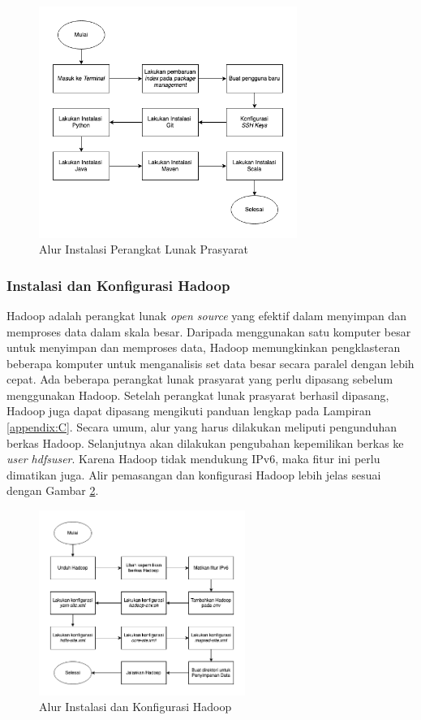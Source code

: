 \begin{figure}[h!]
    \centering
    \includegraphics[width=0.75\textwidth]{figures/ch03/prasayarat-flow.png}
    \caption{Alur Instalasi Perangkat Lunak Prasyarat}
    \label{fig:prasyarat-flow}
\end{figure}


\subsubsection{Instalasi dan Konfigurasi Hadoop}
Hadoop adalah perangkat lunak \textit{open source} yang efektif dalam menyimpan dan memproses data dalam skala besar. Daripada menggunakan satu komputer besar untuk menyimpan dan memproses data, Hadoop memungkinkan pengklasteran beberapa komputer untuk menganalisis set data besar secara paralel dengan lebih cepat. Ada beberapa perangkat lunak prasyarat yang perlu dipasang sebelum menggunakan Hadoop. Setelah perangkat lunak prasyarat berhasil dipasang, Hadoop juga dapat dipasang mengikuti panduan lengkap pada Lampiran \ref{appendix:C}. 
Secara umum, alur yang harus dilakukan meliputi pengunduhan berkas Hadoop. Selanjutnya akan dilakukan pengubahan kepemilikan berkas ke \textit{user hdfsuser}. Karena Hadoop tidak mendukung IPv6, maka fitur ini perlu dimatikan juga. Alir pemasangan dan konfigurasi Hadoop lebih jelas sesuai dengan Gambar \ref{fig:hadoop-flow}.

\begin{figure}[h!]
    \centering
    \includegraphics[width=0.6\textwidth]{figures/ch03/hadoop-flow.png}
    \caption{Alur Instalasi dan Konfigurasi Hadoop}
    \label{fig:hadoop-flow}
\end{figure}

